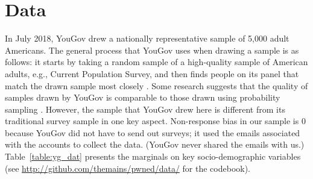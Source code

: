 \documentclass[12pt, letterpaper]{article}
\begin{document}
\section*{Data}
In July 2018, YouGov drew a nationally representative sample of 5,000 adult Americans. The general process that YouGov uses when drawing a sample is as follows: it starts by taking a random sample of a high-quality sample of American adults, e.g., Current Population Survey, and then finds people on its panel that match the drawn sample most closely \citep[for more details, see][]{rivers}. Some research suggests that the quality of samples drawn by YouGov is comparable to those drawn using probability sampling \citep{ansolabehere2014does}. However, the sample that YouGov drew here is different from its traditional survey sample in one key aspect. Non-response bias in our sample is 0 because YouGov did not have to send out surveys; it used the emails associated with the accounts to collect the data. (YouGov never shared the emails with us.) Table~\ref{table:yg_dat} presents the marginals on key socio-demographic variables (see \href{http://github.com/themains/pwned/data/}{http://github.com/themains/pwned/data/} for the codebook). 
\end{document}
